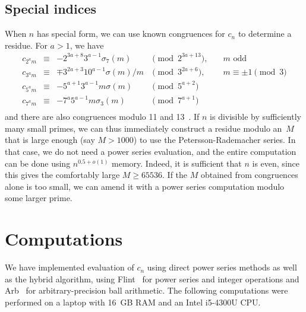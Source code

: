 \documentclass{amsart}
\theoremstyle{definition}
\theoremstyle{remark}
\begin{document}
\subsection{Special indices}

When $n$ has special form, we can use known congruences for $c_n$
to determine a residue. For $a > 1$, we have
\begin{equation*}
\begin{matrix}
c_{2^a m} & \equiv & -2^{3a+8} 3^{a-1} \sigma_7(m) & \pmod {2^{3a+13}}, & \quad m \text{ odd} \\
c_{3^a m} & \equiv & \mp 3^{2a+3} 10^{a-1} \sigma(m)/m & \pmod {3^{2a+6}}, & \quad m \equiv \pm 1 \pmod 3 \\
c_{5^a m} & \equiv & -5^{a+1} 3^{a-1} m \sigma(m) & \pmod {5^{a+2}} \\
c_{7^a m} & \equiv & -7^a 5^{a-1} m \sigma_3(m) & \pmod {7^{a+1}} \\
\end{matrix}
\end{equation*}
and there are also congruences modulo 11 and 13~\cite{aas1964congruences,Newman1958}.
If $n$ is divisible by sufficiently many small primes,
we can thus immediately construct a residue modulo an~$M$
that is large enough (say $M > 1000$) to use the Petersson-Rademacher series.
In that case, we do not need a power series evaluation,
and the entire computation can be done using $n^{0.5+o(1)}$ memory.
Indeed, it is sufficient that $n$ is even, since this gives the comfortably
large $M \ge 65536$.
If the $M$ obtained from congruences alone is too small, we can amend
it with a power series computation modulo some larger prime.

\section{Computations}

We have implemented evaluation of $c_n$ using direct power series
methods as well as the hybrid algorithm, using Flint~\cite{Har2010}
for power series and integer operations
and Arb~\cite{Joh2017} for arbitrary-precision ball arithmetic.
The following computations were performed on a laptop
with 16~GB RAM and an Intel i5-4300U CPU.
\end{document}
